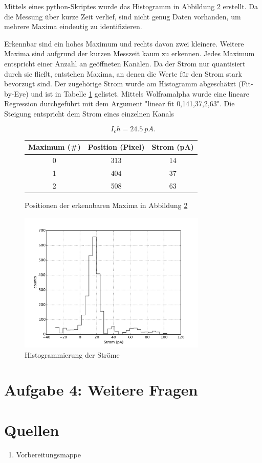\documentclass[a4paper,ngerman]{scrartcl}
\begin{document}
Mittels eines python-Skriptes wurde das Histogramm in Abbildung \ref{fig:mehrkanal-histo} erstellt. Da die Messung über kurze Zeit verlief, sind nicht genug Daten vorhanden, um mehrere Maxima eindeutig zu identifizieren. 

Erkennbar sind ein hohes Maximum und rechts davon zwei kleinere. Weitere Maxima sind aufgrund der kurzen Messzeit kaum zu erkennen.
Jedes Maximum entspricht einer Anzahl an geöffneten Kanälen. Da der Strom nur quantisiert durch sie fließt, entstehen Maxima, an denen die Werte für den Strom stark bevorzugt sind.
Der zugehörige Strom wurde am Histogramm abgeschätzt (Fit-by-Eye) und ist in Tabelle \ref{tab:mehrkanal-maxima} gelistet. Mittels Wolframalpha wurde eine lineare Regression durchgeführt mit dem Argument "linear fit {0,14}{1,37},{2,63}". Die Steigung entspricht dem Strom eines einzelnen Kanals

\begin{equation}
I_ch = \SI{24.5}{pA} .
\end{equation}



\begin{figure}
\begin{tabular}{ccc}
Maximum (\#)	&	Position (Pixel)	&	Strom (pA) \\
\hline
0	&	313	&	14	\\
1	&	404	&	37	\\
2	&	508	&	63	\\
\end{tabular}
\caption{Positionen der erkennbaren Maxima in Abbildung \ref{fig:mehrkanal-histo}}
\label{tab:mehrkanal-maxima}
\end{figure}

\begin{figure}[tbh!]
\includegraphics[width=0.8\textwidth]{abbildungen/mehrkanal_histo.pdf}
\caption{Histogrammierung der Ströme}
\label{fig:mehrkanal-histo}
\end{figure}




\section{Aufgabe 4: Weitere Fragen}






\section{Quellen}
\begin{enumerate}
\item Vorbereitungsmappe \label{ref:mappe}
\end{enumerate}
\end{document}
